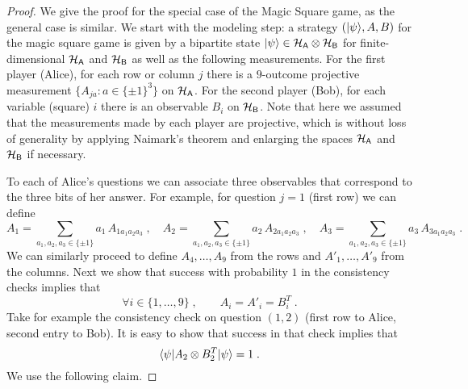 \begin{proof}
We give the proof for the special case of the Magic Square game, as the general case is similar. We start with the modeling step: a strategy $(|\psi\rangle,A,B)$ for the magic square game is given by a bipartite state $|\psi\rangle \in \mathcal{H}_{\textsf{A}} \otimes \mathcal{H}_{\textsf{B}}$ for finite-dimensional $\mathcal{H}_{\textsf{A}}$ and $\mathcal{H}_{{\textsf{B}}}$ as well as the following measurements. For the first player (Alice), for each row or column $j$ there is a $9$-outcome projective measurement $\{A_{ja} : a\in\{\pm 1\}^3\}$ on $\mathcal{H}_{\textsf{A}}$. For the second player (Bob), for each variable (square) $i$ there is an observable $B_{i}$ on $\mathcal{H}_{\textsf{B}}$. Note that here we assumed that the measurements made by each player are projective, which is without loss of generality by applying Naimark's theorem and enlarging the spaces $\mathcal{H}_{\textsf{A}}$ and $\mathcal{H}_{\textsf{B}}$ if necessary. 

To each of Alice's questions we can associate three observables that correspond to the three bits of her answer. For example, for question $j=1$ (first row) we can define 
\[ A_1 = \sum_{a_1,a_2,a_3\in \{\pm 1\}}  a_1\, A_{1a_1a_2a_3}\;,\quad   A_2 = \sum_{a_1,a_2,a_3\in \{\pm 1\}} a_2\, A_{2a_1a_2a_3}\;,\quad  A_3 = \sum_{a_1,a_2,a_3\in \{\pm 1\}}  a_3\, A_{3a_1a_2a_3}\;.\]
We can similarly proceed to define $A_4,\ldots,A_9$ from the rows and $A'_1,\ldots,A'_9$ from the columns. Next we show that success with probability $1$ in the consistency checks implies that 
\begin{equation}\label{eq:bcs-tensor-1}
\forall i\in\{1,\ldots,9\}\;,\qquad A_i = A'_i = B_i^T\;.
\end{equation} 
Take for example the consistency check on question $(1,2)$ (first row to Alice, second entry to Bob). It is easy to show that success in that check implies that 
\begin{equation}\label{eq:bcs-tensor-2}
\langle\psi| A_2 \otimes B_2^T |\psi\rangle=1\;.
\end{equation}
 We use the following claim.


\end{proof}
